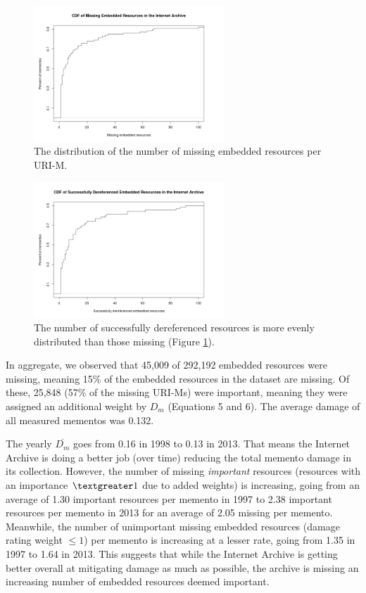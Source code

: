 \begin{figure}[h!]
\includegraphics[width=270px]{./imgs/OccStatsCDF_IA.png}
\caption{The distribution of the number of missing embedded resources per URI-M.}
\label{missingDistro}
\end{figure}

\begin{figure}[h!]
\includegraphics[width=270px]{./imgs/OccStatsFoundCDF_IA.png}
\caption{The number of successfully dereferenced resources is more evenly distributed than those missing (Figure \ref{missingDistro}).}
\label{foundDistro}
\end{figure}



In aggregate, we observed that 45,009 of 292,192 embedded resources were missing, meaning 15\% of the embedded resources in the dataset are missing. Of these, 25,848  (57\% of the missing URI-Ms) were important, meaning they were assigned an additional weight by $D_m$ (Equations 5 and 6). The average damage of all measured mementos was 0.132.

The yearly $\overline{D_m}$ goes from 0.16 in 1998 to 0.13 in 2013. That means the Internet Archive is doing a better job (over time) reducing the total memento damage in its collection. However, the number of missing \emph{important} resources (resources with an importance $\textgreater 1$ due to added weights) is increasing, going from an average of 1.30 important resources per memento in 1997 to 2.38 important resources per memento in 2013 for an average of 2.05 missing per memento. Meanwhile, the number of unimportant missing embedded resources (damage rating weight $\leq 1$) per memento is increasing at a lesser rate, going from 1.35 in 1997 to 1.64 in 2013. This suggests that while the Internet Archive is getting better overall at mitigating damage as much as possible, the archive is missing an increasing number of embedded resources deemed important. 

